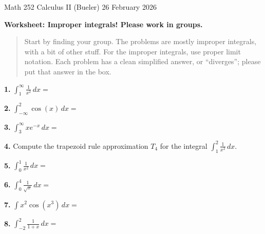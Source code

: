 \documentclass[11pt]{amsart}
\newcommand{\prob}[1]{\bigskip\noindent\textbf{#1.}\quad }
\newcommand{\ds}{\displaystyle}
\begin{document}
\scriptsize \noindent Math 252 Calculus II (Bueler) \hfill 26 February 2026 \quad {}
\normalsize\medskip

\Large\centerline{\textbf{Worksheet: Improper integrals!  Please work in groups.}}
\medskip
\normalsize

\newcommand{\bbox}{\boxed{{\Huge \phantom{foidasuf}}}}

\thispagestyle{empty}
\begin{quote}
Start by finding your group.  The problems are mostly improper integrals, with a bit of other stuff.  For the improper integrals, use proper limit notation.  Each problem has a clean simplified answer, or ``diverges''; please put that answer in the box.
\end{quote}

\prob{1}  $\ds \int_1^\infty \frac{1}{x^2}\,dx = $
\vfill

\hfill \bbox

\prob{2}  $\ds \int_{-\infty}^2 \cos(x)\,dx = $
\vfill

\hfill \bbox

\prob{3}  $\ds \int_3^\infty x e^{-x}\,dx = $
\vfill

\hfill \bbox

\bigskip

\prob{4}  Compute the trapezoid rule approximation $T_4$ for the integral $\ds \int_1^2 \frac{1}{x^2}\,dx$.
\vfill

\hfill \bbox

\clearpage
\newpage


\prob{5}  $\ds \int_0^1 \frac{1}{x^2}\,dx = $
\vfill

\hfill \bbox

\prob{6}  $\ds \int_0^4 \frac{1}{\sqrt{x}}\,dx = $
\vfill

\hfill \bbox

\prob{7}  $\ds \int x^2 \cos(x^3)\,dx = $
\vfill

\hfill \bbox

\prob{8}  $\ds \int_{-2}^2 \frac{1}{1+x}\,dx = $
\vfill

\hfill \bbox
\end{document}
